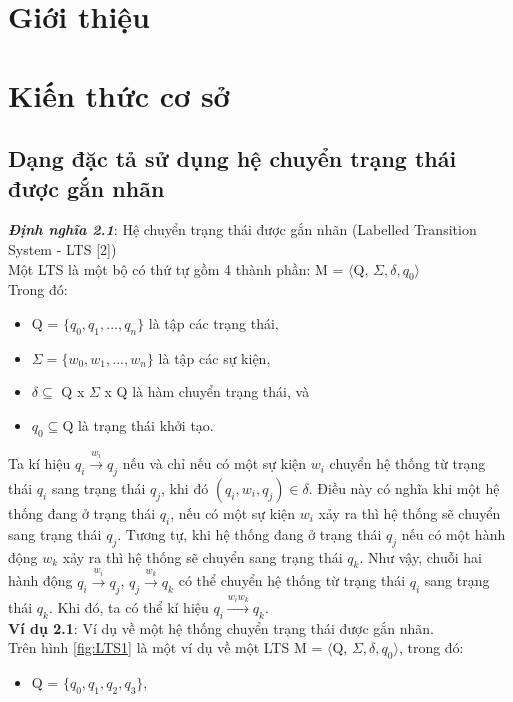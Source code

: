\documentclass[a4paper,13pt,oneside,openany]{book}
\begin{document}
	\begin{flushleft}
	\chapter{Giới thiệu}
	\chapter{Kiến thức cơ sở}
		\section{Dạng đặc tả sử dụng hệ chuyển trạng thái được gắn nhãn}
		\justify
		\textbf{\textit{Định nghĩa 2.1}}: Hệ chuyển trạng thái được gắn nhãn (Labelled Transition System - LTS [2])\\
		Một LTS là một bộ có thứ tự gồm 4 thành phần: M = $\langle$Q, $\Sigma, \delta, q_{0}\rangle$\\
		Trong đó:
		\begin{itemize}
			\item Q = $\{q_{0}, q_{1}, ..., q_{n}\}$ là tập các trạng thái,
			\item $\Sigma = \{w_{0}, w_{1}, ..., w_n\}$ là tập các sự kiện,
			\item $\delta \subseteq$ Q x $\Sigma$ x Q là hàm chuyển trạng thái, và
			\item $q_{0} \subseteq \textrm{Q}$ là trạng thái khởi tạo.
		\end{itemize}
		Ta kí hiệu $q_i \overset{w_i}{\longrightarrow} q_{j}$ nếu và chỉ nếu có một sự kiện $w_i$ chuyển hệ thống từ trạng thái $q_i$ sang trạng thái $q_j$, khi đó $(q_i, w_i, q_j) \in \delta$. Điều này có nghĩa khi một hệ thống đang ở trạng thái $q_i$, nếu có một sự kiện $w_i$ xảy ra thì hệ thống sẽ chuyển sang trạng thái $q_j$. Tương tự, khi hệ thống đang ở trạng thái $q_j$ nếu có một hành động $w_k$ xảy ra thì hệ thống sẽ chuyển sang trạng thái $q_k$. Như vậy, chuỗi hai hành động  $q_i \overset{w_i}{\longrightarrow} q_j$,  $q_j \overset{w_k}{\longrightarrow} q_k$ có thể chuyển hệ thống từ trạng thái $q_i$ sang trạng thái $q_k$. Khi đó, ta có thể kí hiệu  $q_i \overset{w_iw_k}{\longrightarrow} q_{k}$.\\
		\textbf{Ví dụ 2.1}: Ví dụ về một hệ thống chuyển trạng thái được gắn nhãn.\\
		Trên hình \ref{fig:LTS1} là một ví dụ về một LTS M = $\langle$Q, $\Sigma, \delta, q_{0}\rangle$, trong đó:
		\begin{itemize}
			\item Q = $\{q_0, q_1, q_2, q_3\}$,

\end{itemize}
\end{flushleft}
\end{document}
